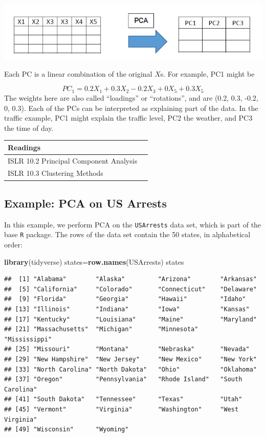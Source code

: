 \documentclass[openany]{book}
\newenvironment{Shaded}{\begin{snugshade}}{\end{snugshade}}
\newcommand{\KeywordTok}[1]{\textcolor[rgb]{0.13,0.29,0.53}{\textbf{#1}}}
\newcommand{\NormalTok}[1]{#1}
\begin{document}
\begin{center}\includegraphics[width=10.47in]{images/PCA} \end{center}

Each PC is a linear combination of the original \(X\)s. For example, PC1 might be

\[PC_1 = 0.2X_1 + 0.3X_2 - 0.2X_3 + 0X_5 + 0.3X_5\]
The weights here are also called ``loadings'' or ``rotations'', and are (0.2, 0.3, -0.2, 0, 0.3). Each of the PCs can be interpreted as explaining part of the data. In the traffic example, PC1 might explain the traffic level, PC2 the weather, and PC3 the time of day.

\begin{longtable}[]{@{}ll@{}}
\toprule
Readings &\tabularnewline
\midrule
\endhead
ISLR 10.2 Principal Component Analysis &\tabularnewline
ISLR 10.3 Clustering Methods &\tabularnewline
\bottomrule
\end{longtable}

\hypertarget{example-pca-on-us-arrests}{%
\subsection{Example: PCA on US Arrests}\label{example-pca-on-us-arrests}}

In this example, we perform PCA on the \texttt{USArrests} data set, which is part of
the base \texttt{R} package. The rows of the data set contain the 50 states, in
alphabetical order:

\begin{Shaded}
\begin{Highlighting}[]
\KeywordTok{library}\NormalTok{(tidyverse)}
\NormalTok{states=}\KeywordTok{row.names}\NormalTok{(USArrests)}
\NormalTok{states}
\end{Highlighting}
\end{Shaded}

\begin{verbatim}
##  [1] "Alabama"        "Alaska"         "Arizona"        "Arkansas"      
##  [5] "California"     "Colorado"       "Connecticut"    "Delaware"      
##  [9] "Florida"        "Georgia"        "Hawaii"         "Idaho"         
## [13] "Illinois"       "Indiana"        "Iowa"           "Kansas"        
## [17] "Kentucky"       "Louisiana"      "Maine"          "Maryland"      
## [21] "Massachusetts"  "Michigan"       "Minnesota"      "Mississippi"   
## [25] "Missouri"       "Montana"        "Nebraska"       "Nevada"        
## [29] "New Hampshire"  "New Jersey"     "New Mexico"     "New York"      
## [33] "North Carolina" "North Dakota"   "Ohio"           "Oklahoma"      
## [37] "Oregon"         "Pennsylvania"   "Rhode Island"   "South Carolina"
## [41] "South Dakota"   "Tennessee"      "Texas"          "Utah"          
## [45] "Vermont"        "Virginia"       "Washington"     "West Virginia" 
## [49] "Wisconsin"      "Wyoming"
\end{verbatim}
\end{document}
